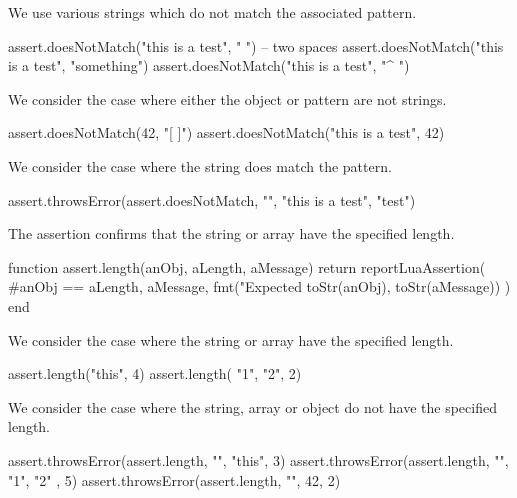 We use various strings which do not match the associated pattern. 

\startLuaTest
  assert.doesNotMatch("this is a test", "  ") -- two spaces
  assert.doesNotMatch("this is a test", "something")
  assert.doesNotMatch("this is a test", "^ ")
\stopLuaTest
\stopTestCase


We consider the case where either the object or pattern are not strings. 

\startLuaTest
  assert.doesNotMatch(42, "[ ]")
  assert.doesNotMatch("this is a test", 42)
\stopLuaTest
\stopTestCase


We consider the case where the string does match the pattern.

\startLuaTest
  assert.throwsError(assert.doesNotMatch, "", "this is a test", "test")
\stopLuaTest
\stopTestCase

\stopTestSuite


The  assertion confirms that the string or array have 
the specified length. 

\startLuaCode
function assert.length(anObj, aLength, aMessage)
  return reportLuaAssertion(
    #anObj == aLength,
    aMessage,
    fmt("Expected %
      toStr(anObj), toStr(aMessage))
  )
end
\stopLuaCode


We consider the case where the string or array have the specified length. 

\startLuaTest
  assert.length("this", 4)
  assert.length({ "1", "2"}, 2)
\stopLuaTest
\stopTestCase


We consider the case where the string, array or object do not have the 
specified length. 

\startLuaTest
  assert.throwsError(assert.length, "", "this", 3)
  assert.throwsError(assert.length, "", { "1", "2" }, 5)
  assert.throwsError(assert.length, "", 42, 2)
\stopLuaTest
\stopTestCase

\stopTestSuite


